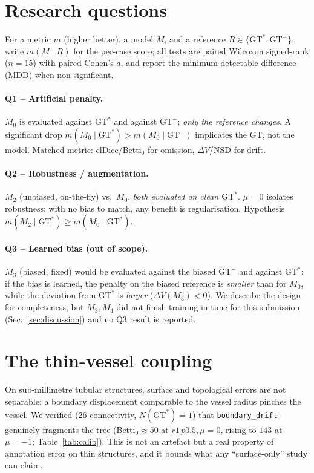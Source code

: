 \documentclass[
    bookmarks, bookmarksnumbered, bookmarksopen,
    colorlinks=true, citecolor=blue, linkcolor=blue, urlcolor=blue
]{techrep}
\newcommand{\gtstar}{\ensuremath{\mathrm{GT}^{\!*}}}
\newcommand{\gtminus}{\ensuremath{\mathrm{GT}^{\!-}}}
\begin{document}
\section{Research questions}
For a metric $m$ (higher better), a model $M$, and a reference $R\in\{\gtstar,\gtminus\}$,
write $m(M\mid R)$ for the per-case score; all tests are paired Wilcoxon signed-rank
($n{=}15$) with paired Cohen's $d$, and report the minimum detectable difference (MDD)
when non-significant.

\paragraph{Q1 -- Artificial penalty.} $M_0$ is evaluated against $\gtstar$ and against
$\gtminus$; \emph{only the reference changes}. A significant drop
$m(M_0\mid\gtstar)\!>\!m(M_0\mid\gtminus)$ implicates the GT, not the model.
Matched metric: clDice/Betti$_0$ for omission, $\Delta V$/NSD for drift.

\paragraph{Q2 -- Robustness / augmentation.} $M_2$ (unbiased, on-the-fly) vs.\ $M_0$,
\emph{both evaluated on clean $\gtstar$}. $\mu{=}0$ isolates robustness: with no bias
to match, any benefit is regularisation. Hypothesis $m(M_2\mid\gtstar)\ge m(M_0\mid\gtstar)$.

\paragraph{Q3 -- Learned bias (out of scope).} $M_3$ (biased, fixed) would be evaluated
against the biased $\gtminus$ and against $\gtstar$: if the bias is learned, the penalty
on the biased reference is \emph{smaller} than for $M_0$, while the deviation from
$\gtstar$ is \emph{larger} ($\Delta V(M_3)<0$). We describe the design for completeness,
but $M_3,M_4$ did not finish training in time for this submission (Sec.~\ref{sec:discussion})
and no Q3 result is reported.

\section{The thin-vessel coupling}\label{sec:coupling}
On sub-millimetre tubular structures, surface and topological errors are not
separable: a boundary displacement comparable to the vessel radius pinches the vessel.
We verified (26-connectivity, $N(\gtstar){=}1$) that \texttt{boundary\_drift} genuinely
fragments the tree (Betti$_0\approx50$ at $r1\,p0.5,\mu{=}0$, rising to $143$ at $\mu{=}{-}1$;
Table~\ref{tab:calib}). This is not an artefact but a real
property of annotation error on thin structures, and it bounds what any ``surface-only''
study can claim.
\end{document}
